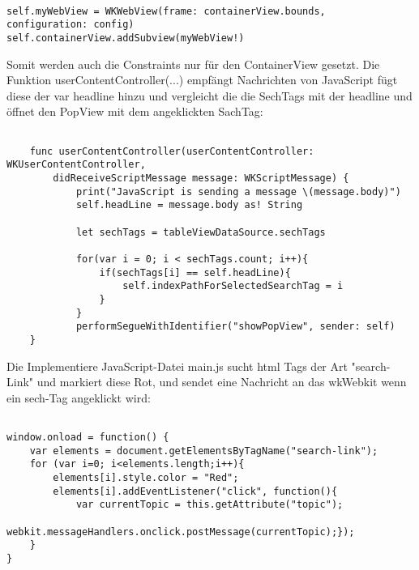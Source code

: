 \begin{verbatim}

self.myWebView = WKWebView(frame: containerView.bounds,
configuration: config)
self.containerView.addSubview(myWebView!)
\end{verbatim}
Somit werden auch die Constraints nur für den ContainerView gesetzt.
Die Funktion userContentController(...) empfängt Nachrichten von JavaScript fügt diese der var headline hinzu und vergleicht die die SechTags mit der headline und öffnet den PopView mit dem angeklickten SachTag:
\begin{verbatim}

    func userContentController(userContentController: WKUserContentController,
        didReceiveScriptMessage message: WKScriptMessage) {
            print("JavaScript is sending a message \(message.body)")
            self.headLine = message.body as! String
            
            let sechTags = tableViewDataSource.sechTags
            
            for(var i = 0; i < sechTags.count; i++){
                if(sechTags[i] == self.headLine){
                    self.indexPathForSelectedSearchTag = i
                }
            }            
            performSegueWithIdentifier("showPopView", sender: self)
    }
\end{verbatim}
Die Implementiere JavaScript-Datei main.js sucht html Tags der Art "search-Link" und markiert diese Rot, und sendet eine Nachricht an das wkWebkit wenn ein sech-Tag angeklickt wird:
\begin{verbatim}

window.onload = function() {    
    var elements = document.getElementsByTagName("search-link");
    for (var i=0; i<elements.length;i++){
        elements[i].style.color = "Red";
        elements[i].addEventListener("click", function(){
            var currentTopic = this.getAttribute("topic");
            webkit.messageHandlers.onclick.postMessage(currentTopic);});
    }
}
\end{verbatim}

\pagebreak

